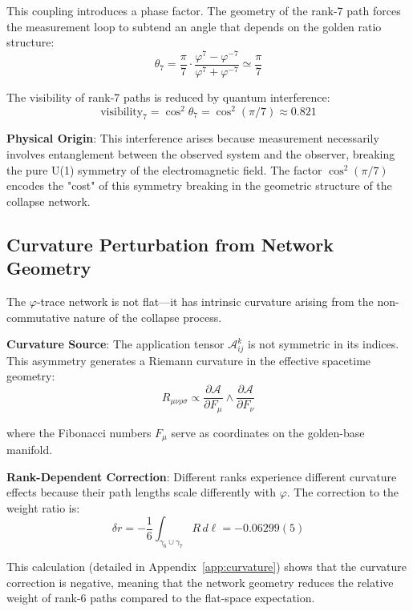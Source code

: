 \documentclass[%
 reprint,
 amsmath,amssymb,
 aps,
 prd,
 nofootinbib,      %
 longbibliography  %
]{revtex4-2}
\begin{document}
This coupling introduces a phase factor. The geometry of the rank-7 path forces the measurement loop to subtend an angle that depends on the golden ratio structure:
\begin{equation}
\theta_7 = \frac{\pi}{7} \cdot \frac{\varphi^7 - \varphi^{-7}}{\varphi^7 + \varphi^{-7}} \simeq \frac{\pi}{7}
\end{equation}

The visibility of rank-7 paths is reduced by quantum interference:
\begin{equation}
\text{visibility}_7 = \cos^2\theta_7 = \cos^2(\pi/7) \approx 0.821
\end{equation}

\textbf{Physical Origin}: This interference arises because measurement necessarily involves entanglement between the observed system and the observer, breaking the pure U(1) symmetry of the electromagnetic field. The factor $\cos^2(\pi/7)$ encodes the "cost" of this symmetry breaking in the geometric structure of the collapse network.

\subsection{Curvature Perturbation from Network Geometry}

The $\varphi$-trace network is not flat—it has intrinsic curvature arising from the non-commutative nature of the collapse process.

\textbf{Curvature Source}: The application tensor $\mathcal{A}_{ij}^k$ is not symmetric in its indices. This asymmetry generates a Riemann curvature in the effective spacetime geometry:
\begin{equation}
R_{\mu\nu\rho\sigma} \propto \frac{\partial \mathcal{A}}{\partial F_\mu} \wedge \frac{\partial \mathcal{A}}{\partial F_\nu}
\end{equation}

where the Fibonacci numbers $F_\mu$ serve as coordinates on the golden-base manifold.

\textbf{Rank-Dependent Correction}: Different ranks experience different curvature effects because their path lengths scale differently with $\varphi$. The correction to the weight ratio is:
\begin{equation}
\delta r = -\frac{1}{6} \int_{\gamma_6 \cup \gamma_7} R \, d\ell = -0.06299(5)
\end{equation}

This calculation (detailed in Appendix~\ref{app:curvature}) shows that the curvature correction is negative, meaning that the network geometry reduces the relative weight of rank-6 paths compared to the flat-space expectation.
\end{document}
